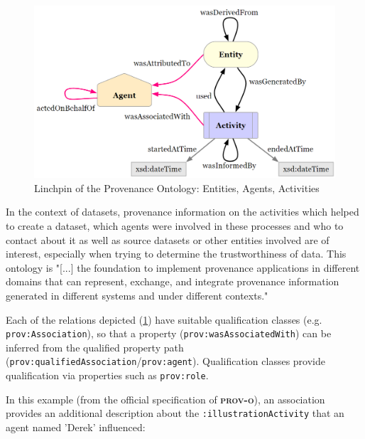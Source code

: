 \documentclass[a4paper,english,twoside,BCOR1.5cm,headsepline,DIV12,appendixprefix,final,12pt]{scrbook}
\newcommand{\prov}{{\scshape\bfseries prov-o}\xspace}
\newcommand{\prop}[1]{{{\texttt{#1}}}}
\begin{document}
\begin{figure}[!htbp]
\centering
  \includegraphics[width=\textwidth]{images/ProvLinchpin.png}
  \caption{Linchpin of the Provenance Ontology: Entities, Agents, Activities \cite{prov}}
  \label{fig:prov}
\end{figure}

In the context of datasets, provenance information on the activities which helped to create a dataset, which agents were involved in these processes and who to contact about it as well as source datasets or other entities involved are of interest, especially when trying to determine the trustworthiness of data. This ontology is "[...] the foundation to implement provenance applications in different domains that can represent, exchange, and integrate provenance information generated in different systems and under different contexts." \cite{prov}

Each of the relations depicted (\cref{fig:prov}) have suitable qualification classes (e.g. \prop{prov:Association}), so that a property (\prop{prov:wasAssociatedWith}) can be inferred from the qualified property path  (\prop{prov:qualifiedAssociation}/\prop{prov:agent}). Qualification classes provide qualification via properties such as \prop{prov:role}. 

In this example (from the official specification of \prov \cite{prov}), an association provides an additional description about the \prop{:illustrationActivity} that an agent named 'Derek' influenced:
\end{document}
